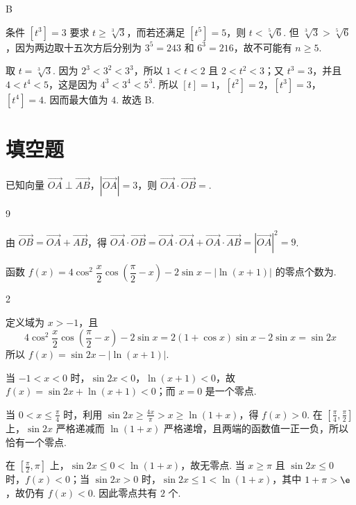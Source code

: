 \begin{answer}
B
\end{answer}

\begin{solution}
条件 \([t^3]=3\) 要求 \(t\geqslant\sqrt[3]{3}\)，而若还满足 \([t^5]=5\)，则 \(t<\sqrt[5]{6}\). 但
\(\sqrt[3]{3}>\sqrt[5]{6}\)，因为两边取十五次方后分别为 \(3^5=243\) 和 \(6^3=216\)，故不可能有 \(n\geqslant5\).

取 \(t=\sqrt[3]{3}\). 因为 \(2^3<3^2<3^3\)，所以 \(1<t<2\) 且 \(2<t^2<3\)；又 \(t^3=3\)，并且
\(4<t^4<5\)，这是因为 \(4^3<3^4<5^3\). 所以 \([t]=1\)，\([t^2]=2\)，\([t^3]=3\)，\([t^4]=4\). 因而最大值为 \(4\). 故选 B.
\end{solution}

\section{填空题}

\begin{problem}
已知向量 \(\overrightarrow{OA}\perp\overrightarrow{AB}\)，\(|\overrightarrow{OA}|=3\)，则 \(\overrightarrow{OA}\cdot\overrightarrow{OB}=\)\fillinblank{}.
\end{problem}

\begin{answer}
9
\end{answer}

\begin{solution}
由 \(\overrightarrow{OB}=\overrightarrow{OA}+\overrightarrow{AB}\)，得
\(\overrightarrow{OA}\cdot\overrightarrow{OB}=\overrightarrow{OA}\cdot\overrightarrow{OA}+\overrightarrow{OA}\cdot\overrightarrow{AB}=|\overrightarrow{OA}|^2=9\).
\end{solution}

\begin{problem}
函数 \(f(x)=4\cos^2\dfrac{x}{2}\cos\left(\dfrac{\pi}{2}-x\right)-2\sin x-|\ln(x+1)|\) 的零点个数为\fillinblank{}.
\end{problem}

\begin{answer}
2
\end{answer}

\begin{solution}
定义域为 \(x>-1\)，且
\[
4\cos^2\frac{x}{2}\cos\left(\frac\pi2-x\right)-2\sin x
=2(1+\cos x)\sin x-2\sin x=\sin2x
\]
所以 \(f(x)=\sin2x-|\ln(x+1)|\).

当 \(-1<x<0\) 时，\(\sin2x<0\)，\(\ln(x+1)<0\)，故 \(f(x)=\sin2x+\ln(x+1)<0\)；而 \(x=0\) 是一个零点.

当 \(0<x\leqslant\frac\pi4\) 时，利用 \(\sin2x\geqslant\frac{4x}{\pi}>x\geqslant\ln(1+x)\)，得 \(f(x)>0\). 在 \([\frac\pi4,\frac\pi2]\) 上，\(\sin2x\) 严格递减而 \(\ln(1+x)\) 严格递增，且两端的函数值一正一负，所以恰有一个零点.

在 \([\frac\pi2,\pi]\) 上，\(\sin2x\leqslant0<\ln(1+x)\)，故无零点. 当 \(x\geqslant\pi\) 且 \(\sin2x\leqslant0\) 时，\(f(x)<0\)；当 \(\sin2x>0\) 时，\(\sin2x\leqslant1<\ln(1+x)\)，其中 \(1+\pi>\e\)，故仍有 \(f(x)<0\). 因此零点共有 \(2\) 个.
\end{solution}

